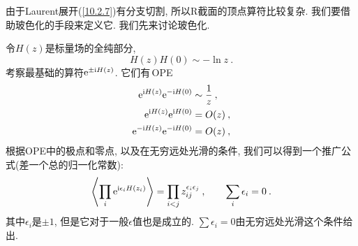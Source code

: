 由于Laurent展开(\ref{10.2.7})有分支切割, 所以R截面的顶点算符比较复杂. 我们要借助玻色化的手段来定义它. 我们先来讨论玻色化.

令$ H(z) $是标量场的全纯部分,
\begin{equation}
    H(z)H(0)\sim -\ln z \:. \label{10.3.5}
\end{equation}
考察最基础的算符$ \mathrm{e}^{\pm\mathrm{i} H(z)}$. 它们有\,OPE
\begin{subequations}
\begin{align}
    \mathrm{e}^{\mathrm{i} H(z)}\mathrm{e}^{-\mathrm{i} H(0)}&\sim \frac{1}{z} \:, \label{10.3.6a} \\
    \mathrm{e}^{\mathrm{i} H(z)}\mathrm{e}^{\mathrm{i} H(0)} &= O(z) \:, \label{10.3.6b} \\
    \mathrm{e}^{-\mathrm{i} H(z)}\mathrm{e}^{-\mathrm{i} H(0)}&= O(z) \:, \label{10.3.6c}
\end{align} \label{10.3.6}
\end{subequations}
根据OPE中的极点和零点, 以及在无穷远处光滑的条件, 我们可以得到一个推广公式(差一个总的归一化常数):
\begin{equation}
    \left\langle \prod_{i}\mathrm{e}^{\mathrm{i}\epsilon_{i}H(z_{i})}\right\rangle
    =\prod_{i<j} z_{ij}^{\epsilon_{i}\epsilon_{j}} \:, \qquad \sum_{i}\epsilon_{i} = 0\:.\label{10.3.7}
\end{equation}
其中$ \epsilon_{i} $是$ \pm1$, 但是它对于一般$ \epsilon $值也是成立的.  $\sum\epsilon_{i}=0$由无穷远处光滑这个条件给出.

